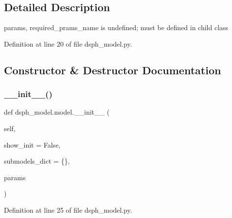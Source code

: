 \subsection{Detailed Description}
\begin{DoxyVerb}params, required_prams_name is undefined; must be defined in child class
\end{DoxyVerb}
 

Definition at line 20 of file dsph\+\_\+model.\+py.



\subsection{Constructor \& Destructor Documentation}
\mbox{\label{classdsph__model_1_1model_a09edf285220369ef40d5f8d9dd352059}} 
\subsubsection{\texorpdfstring{\+\_\+\+\_\+init\+\_\+\+\_\+()}{\_\_init\_\_()}}
{\footnotesize\ttfamily def dsph\+\_\+model.\+model.\+\_\+\+\_\+init\+\_\+\+\_\+ (\begin{DoxyParamCaption}\item[{}]{self,  }\item[{}]{show\+\_\+init = {\ttfamily False},  }\item[{}]{submodels\+\_\+dict = {\ttfamily \{\}},  }\item[{}]{params }\end{DoxyParamCaption})}



Definition at line 25 of file dsph\+\_\+model.\+py.


